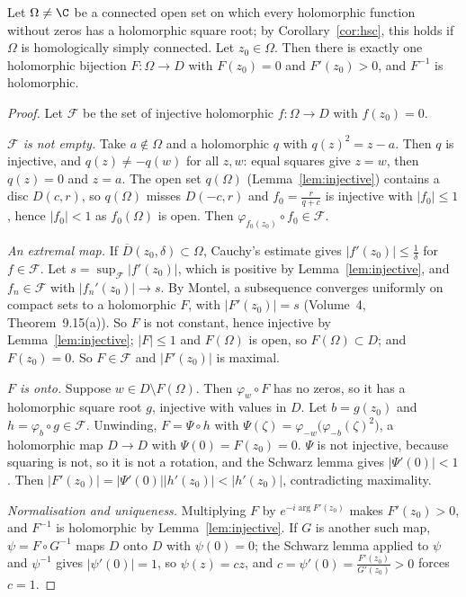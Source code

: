 \begin{theorem}\label{thm:riemannmap}
Let $\Omega\ne\C$ be a connected open set on which every holomorphic function without zeros has a holomorphic square root; by Corollary~\ref{cor:hsc}, this holds if $\Omega$ is homologically simply
connected. Let $z_0\in\Omega$. Then there is exactly one holomorphic bijection $F:\Omega\to D$ with $F(z_0)=0$ and $F'(z_0)>0$, and $F^{-1}$ is holomorphic.
\end{theorem}
\begin{proof}
Let $\mathcal F$ be the set of injective holomorphic $f:\Omega\to D$ with $f(z_0)=0$.

\emph{$\mathcal F$ is not empty.} Take $a\notin\Omega$ and a holomorphic $q$ with $q(z)^2=z-a$. Then $q$ is injective, and $q(z)\ne-q(w)$ for all $z,w$: equal squares give $z=w$, then $q(z)=0$ and $z=a$. The open
set $q(\Omega)$ (Lemma~\ref{lem:injective}) contains a disc $D(c,r)$, so $q(\Omega)$ misses $D(-c,r)$ and $f_0=\frac r{q+c}$ is injective with $|f_0|\le1$, hence $|f_0|<1$ as $f_0(\Omega)$ is open. Then $\varphi_{f_0(z_0)}\circ f_0\in\mathcal F$.

\emph{An extremal map.} If $\overline D(z_0,\delta)\subset\Omega$, Cauchy's estimate gives $|f'(z_0)|\le\frac1\delta$ for $f\in\mathcal F$. Let $s=\sup_{\mathcal F}|f'(z_0)|$, which is positive by Lemma~\ref{lem:injective}, and $f_n\in\mathcal F$ with
$|f_n'(z_0)|\to s$. By Montel, a subsequence converges uniformly on compact sets to a holomorphic $F$, with $|F'(z_0)|=s$ (Volume~4, Theorem~9.15(a)). So $F$ is not constant, hence injective by
Lemma~\ref{lem:injective}; $|F|\le1$ and $F(\Omega)$ is open, so $F(\Omega)\subset D$; and $F(z_0)=0$. So $F\in\mathcal F$ and $|F'(z_0)|$ is maximal.

\emph{$F$ is onto.} Suppose $w\in D\setminus F(\Omega)$. Then $\varphi_w\circ F$ has no zeros, so it has a holomorphic square root $g$, injective with values in $D$. Let $b=g(z_0)$ and $h=\varphi_b\circ g\in\mathcal F$.
Unwinding, $F=\Psi\circ h$ with $\Psi(\zeta)=\varphi_{-w}\bigl(\varphi_{-b}(\zeta)^2\bigr)$, a holomorphic map $D\to D$ with $\Psi(0)=F(z_0)=0$. $\Psi$ is not injective, because squaring is not, so it is not a rotation,
and the Schwarz lemma gives $|\Psi'(0)|<1$. Then $|F'(z_0)|=|\Psi'(0)||h'(z_0)|<|h'(z_0)|$, contradicting maximality.

\emph{Normalisation and uniqueness.} Multiplying $F$ by $e^{-i\arg F'(z_0)}$ makes $F'(z_0)>0$, and $F^{-1}$ is holomorphic by Lemma~\ref{lem:injective}. If $G$ is another such map, $\psi=F\circ G^{-1}$ maps $D$
onto $D$ with $\psi(0)=0$; the Schwarz lemma applied to $\psi$ and $\psi^{-1}$ gives $|\psi'(0)|=1$, so $\psi(z)=cz$, and $c=\psi'(0)=\frac{F'(z_0)}{G'(z_0)}>0$ forces $c=1$.
\end{proof}

